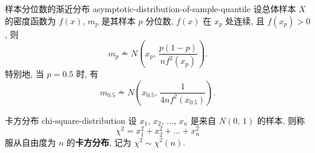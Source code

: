 \begin{newtheorembox}{样本分位数的渐近分布 }{asymptotic-distribution-of-sample-quantile}
	设总体样本 $X$ 的密度函数为 $f(x)$, $m_p$ 是其样本 $p$ 分位数, $f(x)$ 在 $x_p$ 处连续, 且 $f(x_p)>0$, 则
	\[
		m_p\dotsim N\left(x_p,\,\frac{p(1-p)}{nf^2(x_p)}\right).
	\]
	特别地, 当 $p=0.5$ 时, 有
	\[
		m_{0.5}\dotsim N\left(x_{0.5},\,\frac{1}{4nf^2(x_{0.5})}\right).
	\]
\end{newtheorembox}

\begin{newdefbox}{卡方分布 }{chi-square-distribution}
	设 $x_1,\,x_2,\,\dots,\,x_n$ 是来自 $N(0,\,1)$ 的样本, 则称
	\[
		\chi^2=x_1^2+x_2^2+\dots+x_n^2
	\]
	服从自由度为 $n$ 的\textbf{卡方分布}, 记为 $\chi^2\sim\chi^2(n)$.
\end{newdefbox}
